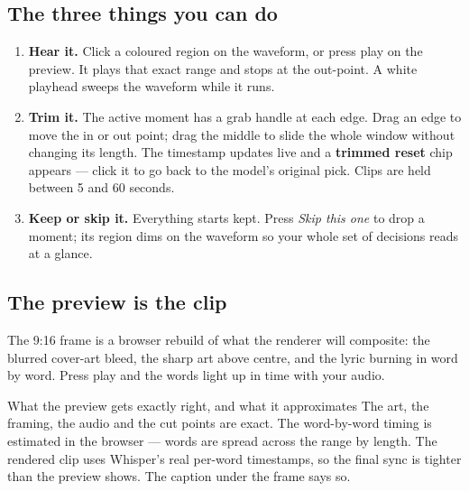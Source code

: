 \documentclass[11pt,a4paper]{article}
\begin{document}
\begin{center}
\end{center}

\subsection{The three things you can do}

\begin{enumerate}
\item \textbf{Hear it.} Click a coloured region on the waveform, or press play
      on the preview. It plays that exact range and stops at the out-point. A
      white playhead sweeps the waveform while it runs.

\item \textbf{Trim it.} The active moment has a grab handle at each edge. Drag
      an edge to move the in or out point; drag the middle to slide the whole
      window without changing its length. The timestamp updates live and a
      \textbf{trimmed \textperiodcentered{} reset} chip appears --- click it to
      go back to the model's original pick. Clips are held between 5 and 60
      seconds.

\item \textbf{Keep or skip it.} Everything starts kept. Press \emph{Skip this
      one} to drop a moment; its region dims on the waveform so your whole set
      of decisions reads at a glance.
\end{enumerate}

\subsection{The preview is the clip}

The 9:16 frame is a browser rebuild of what the renderer will composite: the
blurred cover-art bleed, the sharp art above centre, and the lyric burning in
word by word. Press play and the words light up in time with your audio.

\begin{note}{What the preview gets exactly right, and what it approximates}
The art, the framing, the audio and the cut points are exact. The word-by-word
timing is estimated in the browser --- words are spread across the range by
length. The rendered clip uses Whisper's real per-word timestamps, so the final
sync is tighter than the preview shows. The caption under the frame says so.
\end{note}
\end{document}
